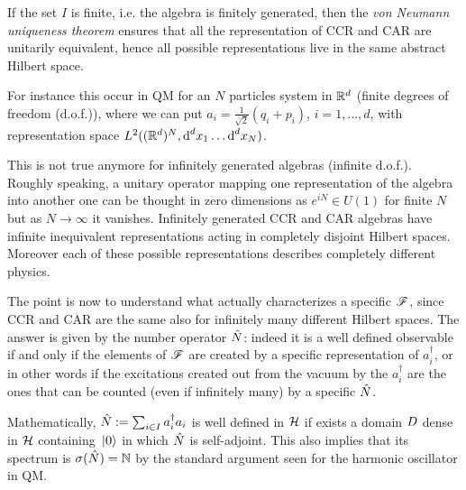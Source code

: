\documentclass[../main/main.tex]{subfiles}
\begin{document}
If the set $I$ is finite, i.e. the algebra is finitely generated, then the \emph{von Neumann uniqueness theorem} ensures that all the representation of CCR and CAR are unitarily equivalent, hence all possible representations live in the same abstract Hilbert space. 

For instance this occur in QM for an $N$ particles system in $\mathbb{R}^d$ (finite degrees of freedom (d.o.f.)), where we can put $a_i=\frac1{\sqrt2}(q_i+p_i)$, $i=1,\dots,d$, with representation space $L^2((\mathbb{R}^d)^N,\textnormal{d}^dx_1\dots\textnormal{d}^dx_N)$. 

This is not true anymore for infinitely generated algebras (infinite d.o.f.). Roughly speaking, a unitary operator mapping one representation of the algebra into another one can be thought in zero dimensions as $e^{iN}\in U(1)$ for finite $N$ but as $N\to\infty$ it vanishes. Infinitely generated CCR and CAR algebras have infinite inequivalent representations acting in completely disjoint Hilbert spaces. Moreover each of these possible representations describes completely different physics.

The point is now to understand what actually characterizes a specific $\mathscr F$, since CCR and CAR are the same also for infinitely many different Hilbert spaces. The answer is given by the number operator $\hat{N}$: indeed it is a well defined observable if and only if the elements of $\mathscr F$ are created by a specific representation of $a_i^\dagger$, or in other words if the excitations created out from the vacuum by the $a_i^\dagger$ are the ones that can be counted (even if infinitely many) by a specific $\hat{N}$. 

Mathematically, $\hat{N}:=\sum_{i\in I}a_i^\dagger a_i$ is well defined in $\mathcal H$ if exists a domain $D$ dense in $\mathcal H$ containing $\,\vert0\rangle$ in which $\hat{N}$ is self-adjoint. This also implies that its spectrum is $\sigma(\hat{N})=\mathbb{N}$ by the standard argument seen for the harmonic oscillator in QM. 
\end{document}
